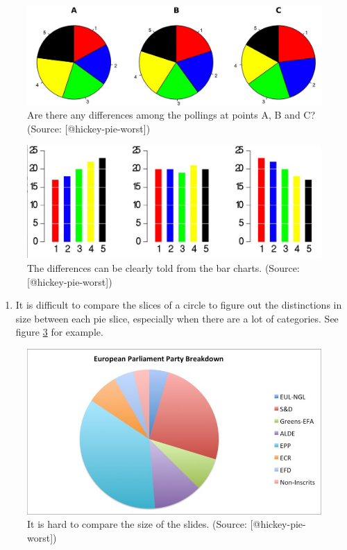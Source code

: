 \documentclass[]{book}
\providecommand{\tightlist}{%
  \setlength{\itemsep}{0pt}\setlength{\parskip}{0pt}}
\theoremstyle{definition}
\theoremstyle{definition}
\theoremstyle{definition}
\theoremstyle{remark}
\begin{document}
\begin{figure}
\includegraphics[width=0.7\linewidth]{images/hickey-before} \caption{Are there any differences among the pollings at points A, B and C? (Source: [@hickey-pie-worst])}\label{fig:hickey-before}
\end{figure}

\begin{figure}
\includegraphics[width=0.7\linewidth]{images/hickey-after} \caption{The differences can be clearly told from the bar charts. (Source: [@hickey-pie-worst])}\label{fig:hickey-after}
\end{figure}

\begin{enumerate}
\def\labelenumi{\arabic{enumi}.}
\setcounter{enumi}{1}
\tightlist
\item
  It is difficult to compare the slices of a circle to figure out the
  distinctions in size between each pie slice, especially when there are
  a lot of categories. See figure \ref{fig:hickey-breakdown} for
  example.
\end{enumerate}

\begin{figure}
\includegraphics[width=0.7\linewidth]{images/hickey-breakdown} \caption{It is hard to compare the size of the slides. (Source: [@hickey-pie-worst])}\label{fig:hickey-breakdown}
\end{figure}
\end{document}
